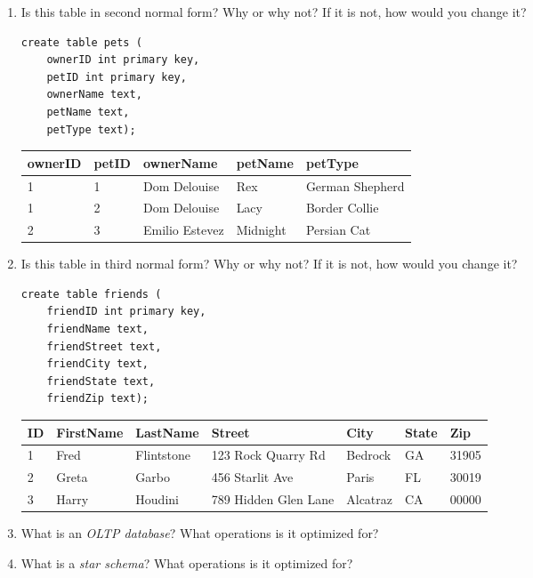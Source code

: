 \documentclass{article}
\begin{document}
\begin{enumerate}
        \item Is this table in second normal form? Why or why not? If it is not, how would you change it?

            \begin{verbatim}
create table pets (
    ownerID int primary key,
    petID int primary key,
    ownerName text,
    petName text,
    petType text);
            \end{verbatim}

            \begin{tabular}{| l | l | l | l | l |}
\hline
\textbf{ownerID} & \textbf{petID} & \textbf{ownerName}  & \textbf{petName} & \textbf{petType} \\
\hline
1 & 1 & Dom Delouise & Rex & German Shepherd \\
\hline
1 & 2 & Dom Delouise & Lacy & Border Collie \\
\hline
2 & 3 & Emilio Estevez & Midnight & Persian Cat \\
\hline
            \end{tabular}

        \item Is this table in third normal form? Why or why not? If it is not, how would you change it?

            \begin{verbatim}
create table friends (
    friendID int primary key,
    friendName text,
    friendStreet text,
    friendCity text,
    friendState text,
    friendZip text);
            \end{verbatim}

            \begin{tabular}{| l | l | l | l | l | l | l |}
\hline
\textbf{ID} & \textbf{FirstName} & \textbf{LastName} & \textbf{Street}  & \textbf{City} & \textbf{State} & \textbf{Zip} \\
\hline
1 & Fred & Flintstone & 123 Rock Quarry Rd & Bedrock & GA & 31905 \\  
\hline
2 & Greta & Garbo & 456 Starlit Ave & Paris & FL & 30019 \\  
\hline
3 & Harry & Houdini & 789 Hidden Glen Lane & Alcatraz & CA & 00000 \\  
\hline
            \end{tabular}

        \item What is an \textit{OLTP database}? What operations is it optimized for?


        \item What is a \textit{star schema}? What operations is it optimized for?


    \end{enumerate}
\end{document}
